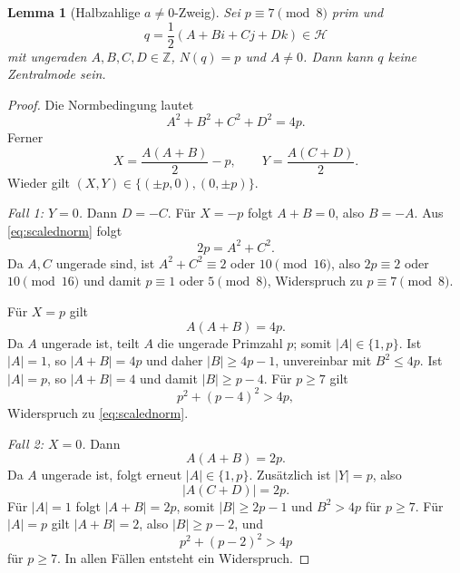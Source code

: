 \documentclass[11pt,a4paper]{article}
\newtheorem{lemma}[satz]{Lemma}
\theoremstyle{definition}
\newcommand{\HH}{\mathcal H}
\newcommand{\ZZ}{\mathbb Z}
\begin{document}
\begin{lemma}[Halbzahlige $a\neq0$-Zweig]\label{lem:halfcase}
Sei $p\equiv7\pmod8$ prim und
\[
q=\frac12(A+Bi+Cj+Dk)\in\HH
\]
mit ungeraden $A,B,C,D\in\ZZ$, $N(q)=p$ und $A\neq0$. Dann kann $q$ keine Zentralmode sein.
\end{lemma}
\begin{proof}
Die Normbedingung lautet
\begin{equation}\label{eq:scalednorm}
A^2+B^2+C^2+D^2=4p.
\end{equation}
Ferner
\[
X=\frac{A(A+B)}2-p,
\qquad
Y=\frac{A(C+D)}2.
\]
Wieder gilt $(X,Y)\in\{(\pm p,0),(0,\pm p)\}$.

\emph{Fall 1: $Y=0$.} Dann $D=-C$. Für $X=-p$ folgt $A+B=0$, also $B=-A$. Aus \eqref{eq:scalednorm} folgt
\[
2p=A^2+C^2.
\]
Da $A,C$ ungerade sind, ist $A^2+C^2\equiv2$ oder $10\pmod{16}$, also $2p\equiv2$ oder $10\pmod{16}$ und damit $p\equiv1$ oder $5\pmod8$, Widerspruch zu $p\equiv7\pmod8$.

Für $X=p$ gilt
\[
A(A+B)=4p.
\]
Da $A$ ungerade ist, teilt $A$ die ungerade Primzahl $p$; somit $|A|\in\{1,p\}$. Ist $|A|=1$, so $|A+B|=4p$ und daher $|B|\ge4p-1$, unvereinbar mit $B^2\le4p$. Ist $|A|=p$, so $|A+B|=4$ und damit $|B|\ge p-4$. Für $p\ge7$ gilt
\[
p^2+(p-4)^2>4p,
\]
Widerspruch zu \eqref{eq:scalednorm}.

\emph{Fall 2: $X=0$.} Dann
\[
A(A+B)=2p.
\]
Da $A$ ungerade ist, folgt erneut $|A|\in\{1,p\}$. Zusätzlich ist $|Y|=p$, also
\[
|A(C+D)|=2p.
\]
Für $|A|=1$ folgt $|A+B|=2p$, somit $|B|\ge2p-1$ und $B^2>4p$ für $p\ge7$. Für $|A|=p$ gilt $|A+B|=2$, also $|B|\ge p-2$, und
\[
p^2+(p-2)^2>4p
\]
für $p\ge7$. In allen Fällen entsteht ein Widerspruch.
\end{proof}
\end{document}
